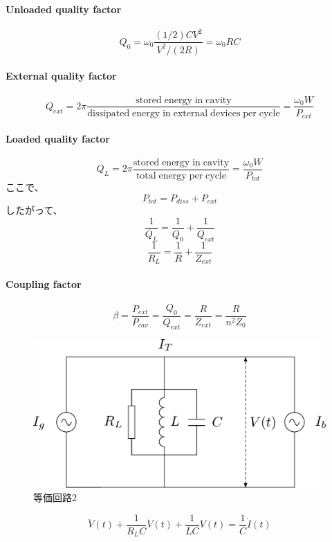 \documentclass[book]{jlreq}
\begin{document}
\paragraph{Unloaded quality factor}
%
\begin{equation}
    Q_0 = \omega_0 \frac{(1/2) C V^2}{V^2/(2R)} = \omega_0 R C
\end{equation}
%
\paragraph{External quality factor}
%
\begin{equation}
    Q_{ext} = 2\pi \frac{\mathrm{stored\;energy\;in\;cavity}}{\mathrm{dissipated \; energy\;in\;external\;devices\;per\;cycle}}
    = \frac{\omega_0 W}{P_{ext}}
\end{equation}
%
\paragraph{Loaded quality factor}
%
\begin{equation}
    Q_L = 2\pi \frac{\mathrm{stored\;energy\;in\;cavity}}{\mathrm{total \; energy\;per\;cycle}} = \frac{\omega_0 W}{P_{tot}}
\end{equation}
%
ここで、
%
\begin{equation}
    P_{tot} = P_{diss} + P_{ext}
\end{equation}
%
したがって、
%
\begin{equation}
    \frac{1}{Q_L} = \frac{1}{Q_0} + \frac{1}{Q_{ext}}
\end{equation}
%
\begin{equation}
    \frac{1}{R_L} = \frac{1}{R} + \frac{1}{Z_{ext}}
\end{equation}
%
\paragraph{Coupling factor \beta}
%
\begin{equation}
    \beta = \frac{P_{ext}}{P_{cav}} = \frac{Q_0}{Q_{ext}} = \frac{R}{Z_{ext}} = \frac{R}{n^2 Z_0}
\end{equation}
%
\begin{figure}[hbt]
    \begin{center}
        \includegraphics[width=12cm,clip]{figs/Equivalent_Circuit2}
        \caption{等価回路2}
        \label{Equivalent_Circuit2}
    \end{center}
\end{figure}
%
\begin{equation}
    \ddot{V}(t) + \frac{1}{R_L C}\dot{V}(t) + \frac{1}{L C} V(t) = \frac{1}{C} \dot{I}(t)
\end{equation}
%
\end{document}
